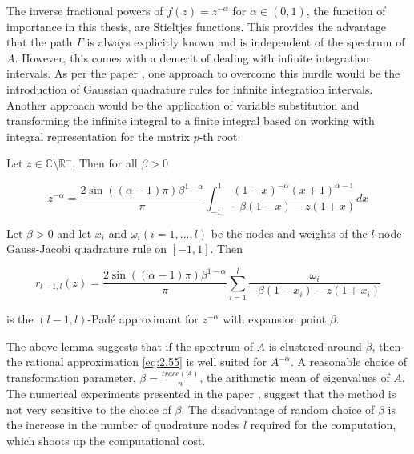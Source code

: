 The inverse fractional powers of $f(z) = z^{-\alpha}$ for $\alpha \in(0,1)$, the function of importance in this thesis, are Stieltjes functions. This provides the advantage that the path $\Gamma$ is always explicitly known and is independent of the spectrum of $A$. However, this comes with a demerit of dealing with infinite integration intervals. As per the paper \cite{57}, one approach to overcome this hurdle would be the introduction of Gaussian quadrature rules for infinite integration intervals. Another approach would be the application of variable substitution and transforming the infinite integral to a finite integral based on \cite{58} working with integral representation for the matrix $p$-th root.

\begin{lemma}
    \label{rem:2.20}
    \cite{52}Let $z \in \mathbb{C} \setminus \mathbb{R}^{-}$. Then for all $\beta > 0$

    \begin{equation}
        z^{-\alpha} = \frac{2 \sin((\alpha-1)\pi) \beta^{1-\alpha}}{\pi} \int_{-1}^{1} \frac{(1-x)^{-\alpha}(x+1)^{\alpha-1}}{-\beta(1-x) - z(1+x)}dx
        \label{eq:2.54}
    \end{equation}
\end{lemma}

\begin{lemma}
    \label{rem:2.21}
    \cite{52}Let $\beta > 0$ and let $x_{i}$ and $\omega_{i} (i=1,...,l)$ be the nodes and weights of the $l$-node Gauss-Jacobi quadrature rule on $[-1,1]$. Then

    \begin{equation}
        r_{l-1,l}(z) = \frac{2 \sin((\alpha-1)\pi) \beta^{1-\alpha}}{\pi} \sum_{i=1}^{l} \frac{\omega_{i}}{-\beta(1-x_{i}) - z(1+x_{i})}
        \label{eq:2.55}
    \end{equation}

    is the $(l-1,l)$-Padé approximant for $z^{-\alpha}$ with expansion point $\beta$.
\end{lemma}

The above lemma suggests that if the spectrum of $A$ is clustered around $\beta$, then the rational approximation \ref{eq:2.55} is well suited for $A^{-\alpha}$. A reasonable choice of transformation parameter, $\beta = \frac{trace(A)}{n}$, the arithmetic mean of eigenvalues of $A$. The numerical experiments presented in the paper \cite{52}, suggest that the method is not very sensitive to the choice of $\beta$. The disadvantage of random choice of $\beta$ is the increase in the number of quadrature nodes $l$ required for the computation, which shoots up the computational cost.

